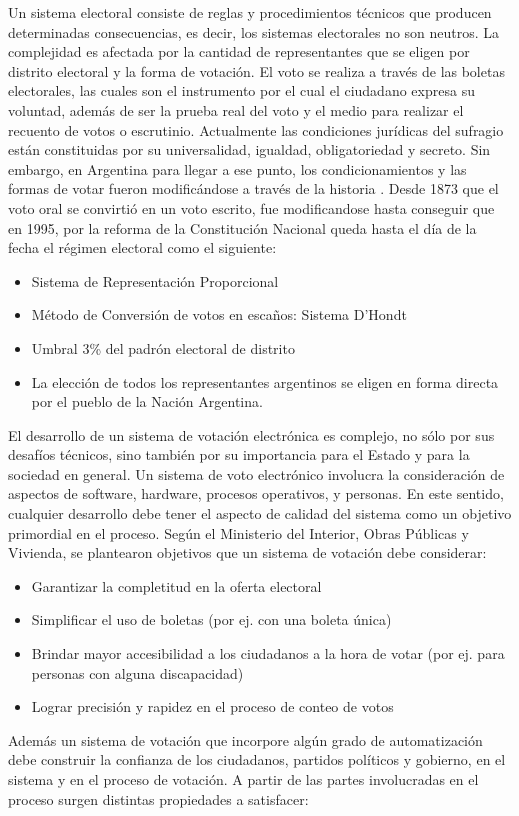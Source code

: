 Un sistema electoral consiste de reglas y procedimientos técnicos que producen determinadas consecuencias, es decir, los sistemas electorales no son neutros. 
La complejidad es afectada por la cantidad de representantes que se eligen por distrito electoral y la forma de votación. El voto se realiza a través de las boletas electorales, las cuales son el instrumento por el cual el ciudadano expresa su voluntad, además de ser la prueba real del voto y el medio para realizar el recuento de votos o escrutinio.
Actualmente las condiciones jurídicas del sufragio están constituidas por su universalidad, igualdad, obligatoriedad y secreto. Sin embargo, en Argentina para llegar a ese punto, los condicionamientos y las formas de votar fueron modificándose a través de la historia \cite{historia}.\newline
Desde 1873 que el voto oral se convirtió en un voto escrito, fue modificandose hasta conseguir que en 1995, por la reforma de la Constitución Nacional queda hasta el día de la fecha el régimen electoral como el siguiente:
\begin{itemize}
    \item Sistema de Representación Proporcional
    \item Método de Conversión de votos en escaños: Sistema D'Hondt
    \item Umbral 3\% del padrón electoral de distrito
    \item La elección de todos los representantes argentinos se eligen en forma directa por el pueblo de la Nación Argentina.
\end{itemize}
\newline
El desarrollo de un sistema de votación electrónica es complejo, no sólo por sus desafíos técnicos, sino también por su importancia para el Estado y para la sociedad en general. Un sistema de voto electrónico involucra la consideración de aspectos de software, hardware, procesos operativos, y personas. En este sentido, cualquier desarrollo debe tener el aspecto de calidad del sistema como un objetivo primordial en el proceso.\newline
Según el Ministerio del Interior, Obras Públicas y Vivienda, se plantearon objetivos que un sistema de votación debe considerar:
\begin{itemize}
    \item Garantizar la completitud en la oferta electoral
    \item Simplificar el uso de boletas (por ej. con una boleta única)
    \item Brindar mayor accesibilidad a los ciudadanos a la hora de votar (por ej. para personas con alguna discapacidad)
    \item Lograr precisión y rapidez en el proceso de conteo de votos
\end{itemize}
Además un sistema de votación que incorpore algún grado de automatización debe construir la confianza de los ciudadanos, partidos políticos y gobierno, en el sistema y en el proceso de votación.\newline
A partir de las partes involucradas en el proceso surgen distintas propiedades a satisfacer:

